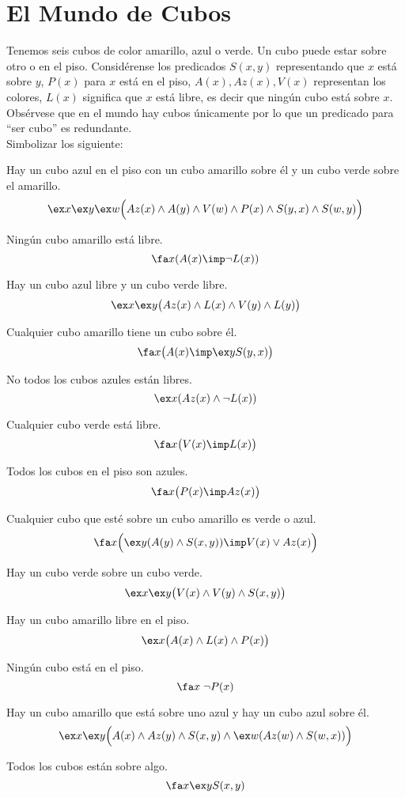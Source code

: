 \documentclass[11pt,letterpaper]{article}
\begin{document}
\section{El Mundo de Cubos}
Tenemos seis cubos de color amarillo, azul o verde. Un cubo puede estar
sobre otro o en el piso. Consid\'erense los predicados $S(x,y)$
representando que $x$ est\'a sobre $y$, $P(x)$ para $x$ está en el piso,  
$A(x),Az(x),V(x)$ representan los colores, $L(x)$ significa que $x$ está
libre, es decir que ning\'un cubo est\'a sobre $x$. Obsérvese que en
el mundo hay cubos únicamente por lo que un predicado para 
\enquote{ser cubo} es redundante.\\ Simbolizar los siguiente:
\bi
 \item Hay un cubo azul en el piso con un cubo amarillo sobre \'el y un
  cubo verde sobre el amarillo. 
  \[
  \ex x\ex y\ex w
  \Big(Az(x)\land A(y)\land V(w)\land P(x)\land S(y,x)\land S(w,y)\Big)
  \]
 \item Ning\'un cubo amarillo est\'a libre.
  \[
  \fa x(A(x)\imp \neg L(x))
  \]
 \item Hay un cubo azul libre y un cubo verde libre.
  \[
  \ex x\ex y\big(Az(x)\land L(x)\land V(y)\land L(y)\big)
  \]
 \item Cualquier cubo amarillo tiene un cubo sobre \'el.
  \[
  \fa x\big(A(x)\imp \ex y S(y,x)\big)
  \]
 \item No todos los cubos azules est\'an libres.
  \[
  \ex x(Az(x)\land\neg L(x))
  \]
 \item Cualquier cubo verde est\'a libre.
  \[
  \fa x\big(V(x)\imp L(x)\big)
  \]
 \item Todos los cubos en el piso son azules.
  \[
  \fa x\big(P(x)\imp Az(x)\big)
  \]
 \item Cualquier cubo que est\'e sobre un cubo amarillo es verde o azul.
  \[
  \fa x\Big(\ex y(A(y)\land S(x,y))\imp V(x)\lor Az(x)\Big)
  \]
 \item Hay un cubo verde sobre un cubo verde.
  \[
  \ex x \ex y\big(V(x)\land V(y)\land S(x,y)\big)
  \]
 \item Hay un cubo amarillo libre en el piso.
  \[
  \ex x\big(A(x)\land L(x)\land P(x)\big)
  \]
 \item Ning\'un cubo est\'a en el piso.
  \[
  \fa x\;\neg P(x)
  \]
 \item Hay un cubo amarillo que est\'a sobre uno azul y hay un cubo azul
  sobre \'el.
  \[
 \ex x \ex y\Big(A(x)\land Az(y)\land S(x,y) \land \ex w(Az(w)\land S(w,x))\Big)
  \]
 \item Todos los cubos est\'an sobre algo.
  \[
  \fa x\ex y S(x,y)
  \]
\ei
\end{document}
